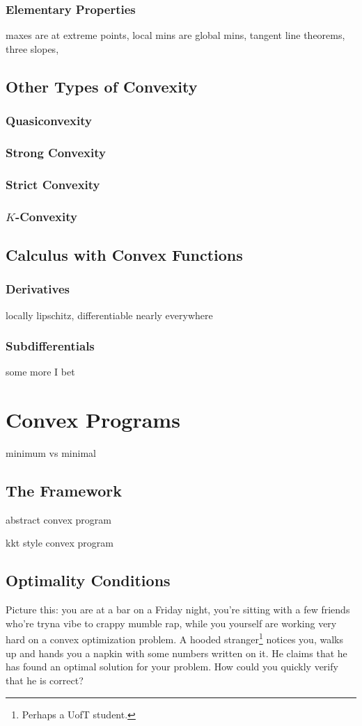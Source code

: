 \documentclass[11pt]{article}
\numberwithin{equation}{section}
\theoremstyle{definition}
\begin{document}
\subsubsection{Elementary Properties}
 maxes are at extreme points, local mins are global mins, tangent line theorems, three slopes,
\subsection{Other Types of Convexity}
\subsubsection{Quasiconvexity}
\subsubsection{Strong Convexity}
\subsubsection{Strict Convexity}
\subsubsection{$K$-Convexity}

\subsection{Calculus with Convex Functions}
\subsubsection{Derivatives}
locally lipschitz, differentiable nearly everywhere
\subsubsection{Subdifferentials}
some more I bet
\section{Convex Programs}
minimum vs minimal
\subsection{The Framework}
abstract convex program

kkt style convex program
\subsection{Optimality Conditions}
Picture this: you are at a bar on a Friday night, you're sitting with a few friends who're tryna vibe to crappy mumble rap, while you yourself are working very hard on a convex optimization problem. A hooded stranger\footnote{Perhaps a UofT student.} notices you, walks up and hands you a napkin with some numbers written on it. He claims that he has found an optimal solution for your problem. How could you quickly verify that he is correct?
\end{document}
